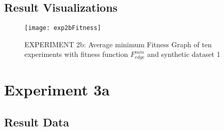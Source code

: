 	\subsection{Result Visualizations}
	\label{sec:A_Exp2b_Diagrams}
		\begin{figure}[H]
			\centering
			\texttt{[image: exp2bFitness]}
			\caption{EXPERIMENT 2b: Average minimum Fitness Graph of ten experiments with fitness function $F_{edge}^{min}$ and synthetic dataset 1}
			\label{fig:exp2bfitness}
		\end{figure}
		
\section{Experiment 3a}
\label{sec:A_Exp3a}
	\subsection{Result Data}
	\label{sec:A_Exp3a_Data}
